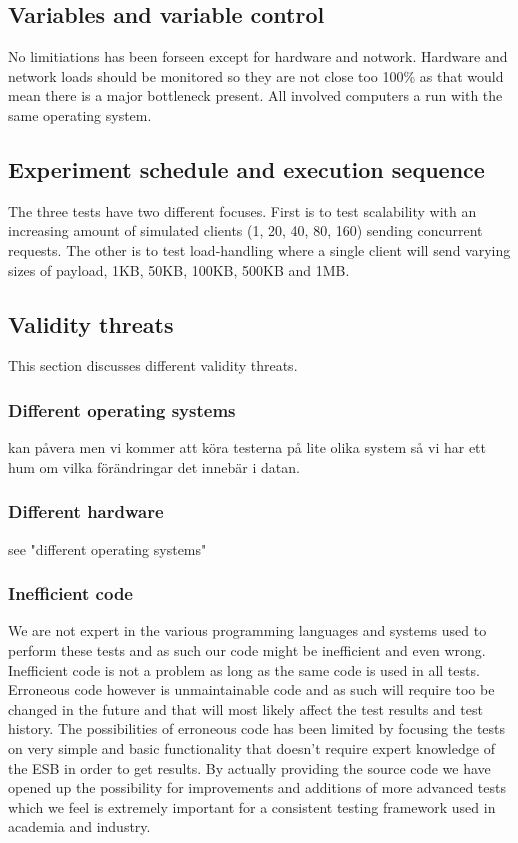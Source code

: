 \subsection{Variables and variable control}
No limitiations has been forseen except for hardware and notwork.
Hardware and network loads should be monitored so they are not close too 100\% as that would mean there is a major bottleneck present. 
All involved computers a run with the same operating system.
\subsection{Experiment schedule and execution sequence}
The three tests have two different focuses. First is to test scalability with an increasing amount of simulated clients (1, 20, 40, 80, 160) sending concurrent requests. 
The other is to test load-handling where a single client will send varying sizes of payload, 1KB, 50KB, 100KB, 500KB and 1MB.
\subsection{Validity threats}
This section discusses different validity threats.
\subsubsection{Different operating systems}
kan påvera men vi kommer att köra testerna på lite olika system så vi har ett hum om vilka förändringar det innebär i datan.
\subsubsection{Different hardware}
see "different operating systems"
\subsubsection{Inefficient code}
We are not expert in the various programming languages and systems used to perform these tests and as such our code might be inefficient and even wrong. Inefficient code is not a problem as long as the same code is used in all tests. Erroneous code however is unmaintainable code and as such will require too be changed in the future and that will most likely affect the test results and test history. 
The possibilities of erroneous code has been limited by focusing the tests on very simple and basic functionality that doesn't require expert knowledge of the ESB in order to get results.
By actually providing the source code we have opened up the possibility for improvements and additions of more advanced tests which we feel is extremely important for a consistent testing framework used in academia and industry.
